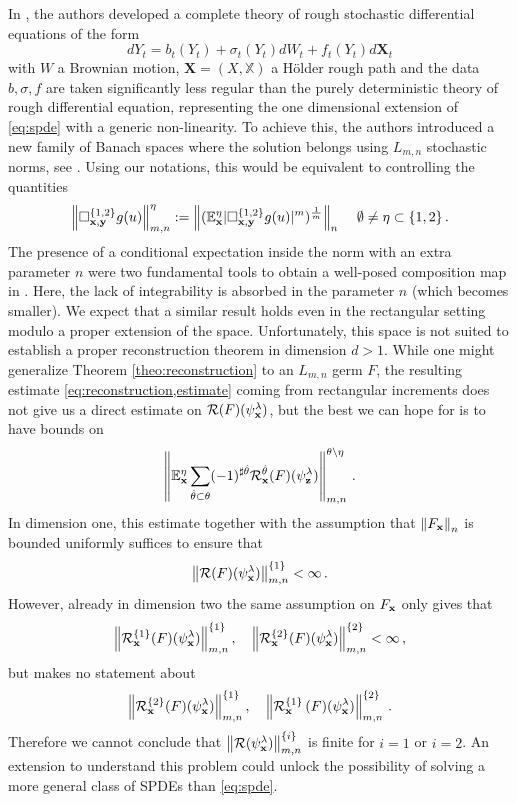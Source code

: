\documentclass[12pt]{article}
\numberwithin{equation}{section}
\theoremstyle{plain}
\theoremstyle{definition}
\newcommand{\norm}[1]{\left\Vert #1\right\Vert}
\def\bE{\mathbb{E}}\def\bW{\mathbb{W}}
\def\fy{\mathbf y}\def\fz{\mathbf z}
\begin{document}
In \cite{Friz_Le_Hocquet21}, the authors developed a complete theory of  rough stochastic differential equations of the form \begin{equation}\label{eq:RSDE} dY_t= b_t(Y_t)+\sigma_t(Y_t) dW_t +   f_t(Y_t) d\mathbf{X}_t \end{equation}with $W$ a Brownian motion, $\mathbf{X}= (X, \mathbb X)$  a H\"older rough path and the data $b,\sigma, f$ are taken significantly less regular than the purely deterministic theory of rough differential equation, representing the one dimensional extension of \eqref{eq:spde} with a generic non-linearity.  To achieve this, the authors introduced a new family of Banach spaces where the solution belongs using $L_{m,n}$ stochastic norms, see \cite[Section 2]{Friz_Le_Hocquet21}. Using our notations, this would be equivalent to controlling the quantities 
\begin{equation*}
    \norm{\square^{\{1,2\}}_{\fx,\fy} g(u)}_{m,n}^{\eta} := \norm{(\bE_\fx^\eta|\square^{\{1,2\}}_{\fx,\fy} g(u)|^m)^{\frac{1}{m}}}_n \, \quad \emptyset\neq \eta\subset \{1,2\}\,.
\end{equation*}
The presence of a conditional expectation inside the norm with an extra parameter $n$ were two fundamental tools to obtain a well-posed composition map in \cite[Lemma 3.13]{Friz_Le_Hocquet21}. Here, the lack of integrability is absorbed in the parameter $n$ (which becomes smaller). We expect that a similar result holds even in the rectangular setting  modulo a proper extension of the space. Unfortunately, this space is not suited to establish a proper reconstruction theorem in dimension $d>1$. While one might  generalize Theorem \ref{theo:reconstruction} to an $L_{m,n}$ germ $F$, the resulting estimate \eqref{eq:reconstruction,estimate} coming from rectangular increments does not give us a direct estimate on $\mathcal{R}(F)(\psi_{\mathbf x}^{\lambda})$, but the best we can hope for is to have bounds on
\[
    \norm{\bE_\fx^\eta  \sum_{\hat\theta\subset\theta}(-1)^{\sharp{\hat\theta}} \mathcal{R}^{\hat\theta}_\fx(F)(\psi^{\lambda}_\fz)}_{m,n}^{\theta\setminus\eta}\,.
\]
In dimension one, this estimate together with the assumption that $\norm{F_\fx}_{n}$ is bounded uniformly  suffices to ensure that 
\[
\norm{\mathcal{R}(F)(\psi_\fx^\lambda)}_{m,n}^{\{1\}}<\infty\,.
\] 
However, already in dimension two the same assumption on $F_\mathbf x$ only gives that
\begin{equation*}
    \norm{\mathcal{R}^{\{1\}}_\fx(F) (\psi_\fx^\lambda)}_{m,n}^{\{1\}}, \quad \norm{\mathcal{R}^{\{2\}}_\fx (F)(\psi_\fx^\lambda)}_{m,n}^{\{2\}} <\infty\,,
\end{equation*}
but makes no statement about
\[
\norm{\mathcal{R}^{\{2\}}_\fx(F) (\psi_\fx^\lambda)}_{m,n}^{\{1\}},\quad \norm{\mathcal{R}^{\{1\}}_\fx\,(F) (\psi_\fx^\lambda)}_{m,n}^{\{2\}}\,.
\]
Therefore we cannot conclude that $\norm{\mathcal{R} (\psi_\fx^\lambda)}_{m,n}^{\{i\}}$ is finite for $i=1$ or $i=2$. An extension to understand this problem could unlock the possibility of solving a more general class of SPDEs than \eqref{eq:spde}.
\end{document}
